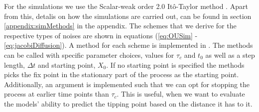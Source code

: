 For the simulations we use the Scalar-weak order 2.0 Itô-Taylor method \cite[algorithm 8.5]{Srkk2019}. Apart from this, detalis on how the simulations are carried out, can be found in section \ref{appendix:simMethods} in the appendix. The schemes that we derive for the respective types of noises are shown in equations (\ref{eq:OUSim} - \ref{eq:jacobiDiffusion}). A method for each scheme is implemented in . The methods can be called with specific parameter choices, values for $\tau_c$ and $t_0$ as well as a step length, $\Delta t$ and starting point, $X_0$. If no starting point is specified the methods picks the fix point in the stationary part of the process as the starting point. Additionally, an argument is implemented such that we can opt for stopping the process at earlier time points than $\tau_c$. This is useful, when we want to evaluate the models' ability to predict the tipping point based on the distance it has to it.